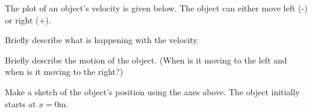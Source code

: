 
\begin{problem}
  \item The plot of an object's velocity is given below. The object
    can either move left (-) or right (+).

  \scalebox{0.7 }{}

    \begin {subproblem}
      \item Briefly describe what is happening with the velocity.
        \vfill

      \item Briefly describe the motion of the object. (When is it
        moving to the left and when is it moving to the right?)
        \vfill

      \item Make a sketch of the object's position using the axes above.
            The object initially starts at $x=0$m.
    \end{subproblem}

\end{problem}


